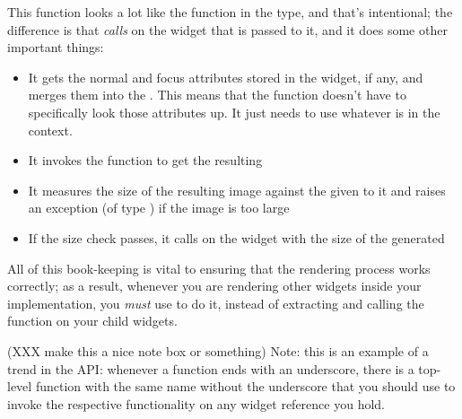 This function looks a lot like the  function in the
 type, and that's intentional; the difference is that
 \textit{calls}  on the widget that is passed
to it, and it does some other important things:

\begin{itemize}
\item It gets the normal and focus attributes stored in the widget, if
  any, and merges them into the .  This means that
  the  function doesn't have to specifically look those
  attributes up.  It just needs to use whatever is in the context.
\item It invokes the  function to get the resulting
\item It measures the size of the resulting image against the
   given to it and raises an exception (of type
  ) if the image is too large
\item If the size check passes, it calls  on the
  widget with the size of the generated 
\end{itemize}

All of this book-keeping is vital to ensuring that the rendering
process works correctly; as a result, whenever you are rendering other
widgets inside your  implementation, you \textit{must}
use  to do it, instead of extracting and calling the
 function on your child widgets.

\label{note:api_convention_1}
(XXX make this a nice note box or something)
Note: this is an example of a trend in the API: whenever a
 function ends with an underscore, there is a
top-level function with the same name without the underscore that
you should use to invoke the respective functionality on any widget
reference you hold.
